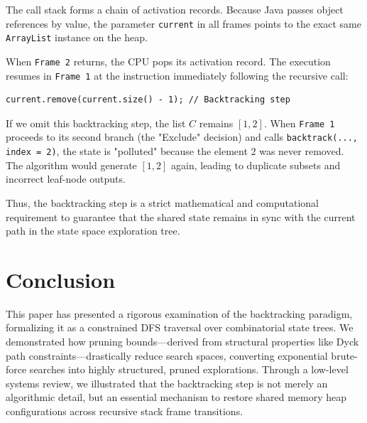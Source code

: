 \documentclass[10pt,journal,compsoc,onecolumn]{IEEEtran}
\begin{document}
The call stack forms a chain of activation records. Because Java passes object references by value, the parameter \texttt{current} in all frames points to the exact same \texttt{ArrayList} instance on the heap. 

When \texttt{Frame 2} returns, the CPU pops its activation record. The execution resumes in \texttt{Frame 1} at the instruction immediately following the recursive call:
\begin{verbatim}
current.remove(current.size() - 1); // Backtracking step
\end{verbatim}
If we omit this backtracking step, the list $C$ remains $[1, 2]$. When \texttt{Frame 1} proceeds to its second branch (the "Exclude" decision) and calls \texttt{backtrack(..., index = 2)}, the state is "polluted" because the element $2$ was never removed. The algorithm would generate $[1, 2]$ again, leading to duplicate subsets and incorrect leaf-node outputs. 

Thus, the backtracking step is a strict mathematical and computational requirement to guarantee that the shared state remains in sync with the current path in the state space exploration tree.

\section{Conclusion}
This paper has presented a rigorous examination of the backtracking paradigm, formalizing it as a constrained DFS traversal over combinatorial state trees. We demonstrated how pruning bounds—derived from structural properties like Dyck path constraints—drastically reduce search spaces, converting exponential brute-force searches into highly structured, pruned explorations. Through a low-level systems review, we illustrated that the backtracking step is not merely an algorithmic detail, but an essential mechanism to restore shared memory heap configurations across recursive stack frame transitions.
\end{document}
